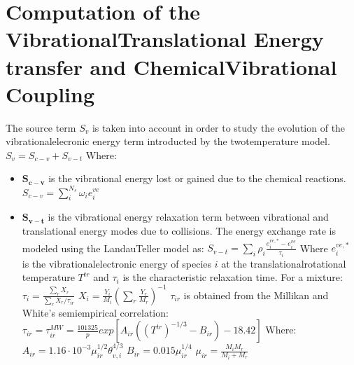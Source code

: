 \documentclass[letterpaper,10pt,english]{jupyterBook}
\begin{document}
\section{Computation of the Vibrational\sphinxhyphen{}Translational Energy transfer and Chemical\sphinxhyphen{}Vibrational Coupling}
\label{\detokenize{2_Temperature/_2T_Problem_class_definition:computation-of-the-vibrational-translational-energy-transfer-and-chemical-vibrational-coupling}}
\sphinxAtStartPar
The source term \(S_v\) is taken into account in order to study the evolution of the vibrational\sphinxhyphen{}elecronic energy term introducted by the two\sphinxhyphen{}temperature model.
\( S_v = S_{c-v} + S_{v-t} \) 
Where:
\begin{itemize}
\item {} 
\sphinxAtStartPar
\(\mathbf{S_{c-v}}\) is the vibrational energy lost or gained due to the chemical reactions. 
\( S_{c-v} = \sum_{i}^{N_s} \omega_i e^{ve}_i \) 

\item {} 
\sphinxAtStartPar
\(\mathbf{S_{v-t}} \) is the vibrational energy relaxation term between vibrational and translational energy modes due to collisions.
The energy exchange rate is modeled using the Landau\sphinxhyphen{}Teller model as: 
\( S_{v-t} = \sum_i \rho_i \frac{e^{ve,*}_i - e^{ve}_i}{\tau_i} \) 
Where \(e^{ve,*}_i\) is the vibrational\sphinxhyphen{}electronic energy of species \(i\) at the translational\sphinxhyphen{}rotational temperature \(T^{tr}\) and \(\tau_i\) is the characteristic relaxation time. For a mixture: 
\( \tau_i = \frac{\sum_r X_r}{\sum_r X_r/\tau_{ir}} \) 
\( X_i = \frac{Y_i}{M_i} \left( \sum_{r}\frac{Y_r}{M_r} \right)^{-1} \) 
\(\tau_{ir}\) is obtained from the Millikan and White’s semiempirical correlation: 
\( \tau_{ir} = \tau_{ir}^{MW} = \frac{101325}{p} exp \left[ A_{ir} \left(\left(T^{tr}\right)^{-1/3} - B_{ir} \right) - 18.42 \right] \) 
Where:
\( A_{ir} = 1.16 \cdot 10^{-3} \mu_{ir}^{1/2} \theta_{v,i}^{4/3} \) 
\( B_{ir} = 0.015 \mu_{ir}^{1/4} \) 
\( \mu_{ir} = \frac{M_i M_r}{M_i + M_r} \) 

\end{itemize}
\end{document}
